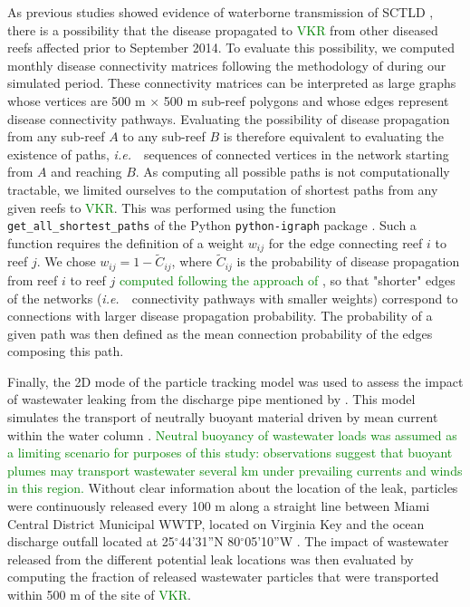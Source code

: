 \documentclass[preprint,12pt,authoryear]{elsarticle}
\newcommand{\ie}{{\it i.e.}\ }
\newcommand{\modif}[1]{\textcolor{green}{#1}}
\begin{document}
As previous studies showed evidence of waterborne transmission of SCTLD \citep{aeby2019pathogenesis, dobbelaere2020coupled,eaton2021measuring, meiling2021variable}, there is a possibility that the disease propagated to \modif{VKR} from other diseased reefs affected prior to September 2014. To evaluate this possibility, we computed monthly disease connectivity matrices following the methodology of \cite{dobbelaere2020coupled} during our simulated period. These connectivity matrices can be interpreted as large graphs whose vertices are 500 m $\times$ 500 m sub-reef polygons and whose edges represent disease connectivity pathways. Evaluating the possibility of disease propagation from any sub-reef $A$ to any sub-reef $B$ is therefore equivalent to evaluating the existence of paths, \ie~sequences of connected vertices in the network starting from $A$ and reaching $B$. As computing all possible paths is not computationally tractable, we limited ourselves to the computation of shortest paths from any given reefs to \modif{VKR}. This was performed using the function \texttt{get\_all\_shortest\_paths} of the Python \texttt{python-igraph} package \citep{csardi2006igraph}. Such a function requires the definition of a weight $w_{ij}$ for the edge connecting reef $i$ to reef $j$. We chose $w_{ij} = 1-\tilde{C}_{ij}$, where $\tilde{C}_{ij}$ is the probability of disease propagation from reef $i$ to reef $j$ \modif{computed following the approach of \cite{dobbelaere2020coupled}}, so that "shorter" edges of the networks (\ie~connectivity pathways with smaller weights) correspond to connections with larger disease propagation probability. The probability of a given path was then defined as the mean connection probability of the edges composing this path.

Finally, the 2D mode of the particle tracking model was used to assess the impact of wastewater leaking from the discharge pipe mentioned by \cite{gintert2019regional}. This model simulates the transport of neutrally buoyant material driven by mean current within the water column \citep{dobbelaere2020coupled}. \modif{Neutral buoyancy of wastewater loads was assumed as a limiting scenario for purposes of this study: observations \citep{bloetscher2014use,wanninkhof2005farfield} suggest that buoyant plumes may transport wastewater several km under prevailing currents and winds in this region.} Without clear information about the location of the leak, particles were continuously released every 100 m along a straight line between Miami Central District Municipal WWTP, located on Virginia Key and the ocean discharge outfall located at 25$^\circ$44'31''N 80$^\circ$05'10''W \citep{koopman2006ocean}. The impact of wastewater released from the different potential leak locations was then evaluated by computing the fraction of released wastewater particles that were transported within 500 m of the site of \modif{VKR}.
\end{document}

